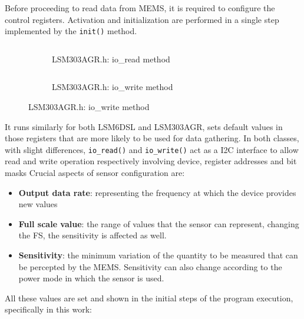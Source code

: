 Before proceeding to read data from MEMS, it is required to configure the control registers. Activation and initialization are performed in a single step implemented by the \texttt{init()} method.\newline

\begin{center}
	\begin{figure}[H]
		\begin{subfigure}[H]{0.5\textwidth}
			\inputminted[framesep=1.5cm, firstline=56, lastline=71, bgcolor=whitesmoke, fontsize=\tiny]{C++}{code/data_gathering.cpp}
			\vspace{-20pt}
			\caption{LSM303AGR.h: io\_read method}\label{fig:5a}
		\end{subfigure}
		\hfill
		\begin{subfigure}[H]{0.5\textwidth}
			\vspace{+1pt}
			\inputminted[framesep=1.5cm, firstline=72, lastline=98, bgcolor=whitesmoke, fontsize=\tiny]{C++}{code/data_gathering.cpp}
			\vspace{-20pt}
			\caption{LSM303AGR.h: io\_write method}\label{fig:5b}
		\end{subfigure}
	\end{figure}
\end{center}
It runs similarly for both LSM6DSL and LSM303AGR, sets default values in those registers that are more likely to be used for data gathering. In both classes, with slight differences, \texttt{io_read()} and \texttt{io_write()} act as a I2C interface to allow read and write operation respectively involving device, register addresses and bit masks\newline 
Crucial aspects of sensor configuration are:
\begin{itemize}
	\item \textbf{Output data rate}: representing the frequency at which the device provides new values
	\item \textbf{Full scale value}: the range of values that the sensor can represent, changing the FS, the sensitivity is affected as well.  
	\item \textbf{Sensitivity}: the minimum variation of the quantity to be measured that can be percepted by the MEMS. Sensitivity can also change according to the power mode in which the sensor is used.
\end{itemize}
All these values are set and shown in the initial steps of the program execution, specifically in this work: 



